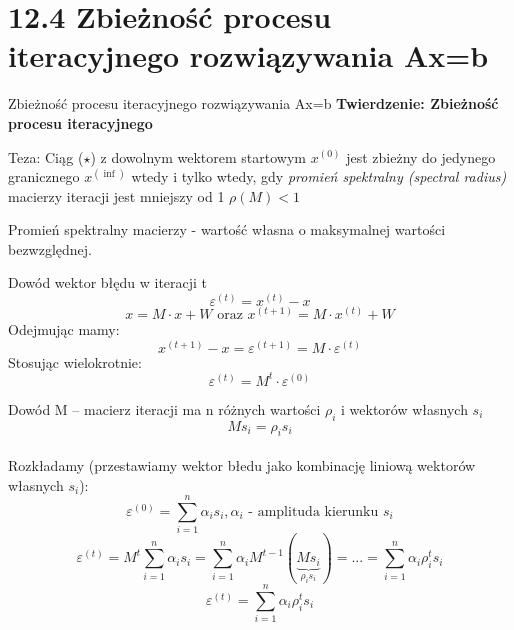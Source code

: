 \section{12.4 Zbieżność procesu iteracyjnego rozwiązywania Ax=b}

\begin{frame}{Zbieżność procesu iteracyjnego rozwiązywania Ax=b}
  \textbf{Twierdzenie: Zbieżność procesu iteracyjnego}
  \begin{block}{Teza:}
    \center Ciąg ($\star$) z dowolnym wektorem startowym $x^{(0)}$ jest zbieżny do jedynego granicznego $x^{(\inf)}$ wtedy i tylko wtedy, gdy \emph{promień spektralny (spectral radius)} macierzy iteracji jest mniejszy od 1
    \center $\rho(M)<1$
  \end{block}
  Promień spektralny macierzy -  wartość własna o maksymalnej wartości bezwzględnej.
\end{frame}

\begin{frame}{Dowód}
  wektor błędu w iteracji t
    $$\varepsilon^{(t)}=x^{(t)}-x$$ 
    $$
    x=M \cdot x+W \text{ oraz } x^{(t+1)}=M \cdot
    x^{(t)}+W
    $$
    Odejmując mamy:
    $$
    x^{(t+1)}-x=\varepsilon^{(t+1)}= M \cdot \varepsilon^{(t)} 
    $$
    Stosując wielokrotnie:
    $$
    \varepsilon^{(t)}=M^t \cdot \varepsilon^{(0)}
    $$
    
    
  
\end{frame}

\begin{frame}{Dowód}
    M -- macierz iteracji ma n różnych wartości $\rho_i$ i wektorów własnych
    $s_i$
   $$Ms_i=\rho_i s_i$$
    \\Rozkładamy (przestawiamy wektor błedu jako kombinację liniową wektorów własnych $s_i$):
    $$\varepsilon^{(0)}= \sum_{i = 1}^{n} \alpha _i s_i , \alpha _i \text{ - amplituda kierunku } s_i
    $$
    $$
    \varepsilon^{(t)}=M^t \sum_{i = 1}^{n} \alpha _i s_i = \sum_{i = 1}^{n} \alpha _i M^{t-1}(\underbrace{Ms_i}_{\rho _i s_i}) = ... = \sum_{i = 1}^{n} \alpha _i \rho _i^t s_i $$
    $$
    \boxed{\varepsilon^{(t)}=\sum_{i = 1}^{n} \alpha _i \rho _i^t s_i} 
    $$
\end{frame}

